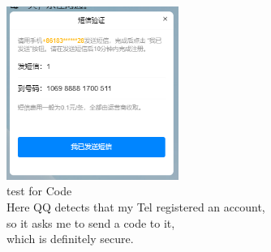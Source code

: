 \documentclass[11pt, oneside]{article}  %
\begin{document}
\begin{figure}[H]
    \centering
    \includegraphics[width=0.5\textwidth]{pic/3.3.8.png}
    \caption{test for Code \\ Here QQ detects that my Tel registered an account, \\ so it asks me to send a code to it, \\which is definitely secure.}
\end{figure}
\end{document}
